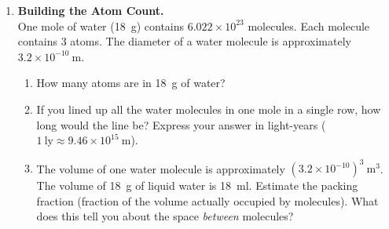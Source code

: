 \documentclass[12pt, a4paper]{book}
\theoremstyle{definition}
\begin{document}
\begin{deepbox}
\begin{enumerate}[label=\textbf{D\arabic*.}]
\begin{enumerate}[label=(\alph*)]
          \item If Dalton had used natural chlorine in his experiments,
                why would the mass ratios he measured still obey
                the law of definite proportions?
                (Hint: what is the probability distribution of
                 vs  in a large sample?)

          \item Dalton's postulate says atoms of the same element are
                identical. Isotopes violate this.
                But the law of multiple proportions still holds.
                Explain why the existence of isotopes does not
                destroy Dalton's framework,
                even though it contradicts his postulate.
        \end{enumerate}

  \item \textbf{Building the Atom Count.}\\
        One mole of water (\SI{18}{\gram}) contains
        $6.022\times10^{23}$ molecules.
        Each molecule contains 3 atoms.
        The diameter of a water molecule is approximately
        $3.2\times10^{-10}\ \si{\metre}$.

        \begin{enumerate}[label=(\alph*)]
          \item How many atoms are in \SI{18}{\gram} of water?

          \item If you lined up all the water molecules in
                one mole in a single row,
                how long would the line be?
                Express your answer in light-years
                ($1\ \text{ly} \approx 9.46\times10^{15}\ \si{\metre}$).

          \item The volume of one water molecule is approximately
                $(3.2\times10^{-10})^3\ \si{\metre\cubed}$.
                The volume of \SI{18}{\gram} of liquid water is
                \SI{18}{\milli\litre}.
                Estimate the packing fraction
                (fraction of the volume actually occupied by molecules).
                What does this tell you about the space \emph{between}
                molecules?
        \end{enumerate}

\end{enumerate}
\end{deepbox}
\end{document}
